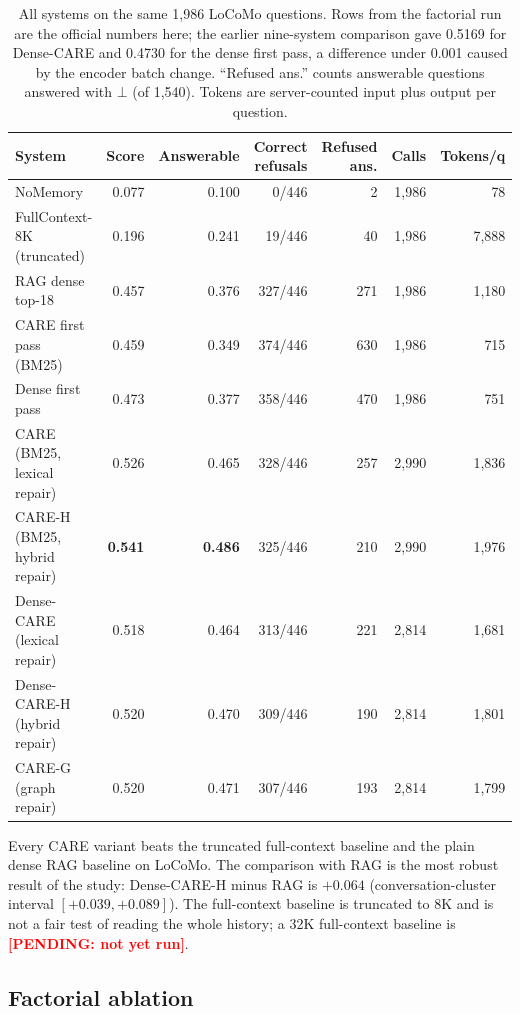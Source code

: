 \documentclass[10pt]{article}
\theoremstyle{plain}
\newcommand{\care}{\textsc{CARE}}
\newcommand{\pending}[1]{\textcolor{red}{\textbf{[PENDING: #1]}}}
\begin{document}
\begin{table}[t]
\centering
\caption{All systems on the same 1,986 LoCoMo questions. Rows from the factorial run are the official numbers here; the earlier nine-system comparison gave 0.5169 for Dense-CARE and 0.4730 for the dense first pass, a difference under 0.001 caused by the encoder batch change. ``Refused ans.'' counts answerable questions
answered with $\bot$ (of 1,540). Tokens are server-counted input plus output per question.}
\label{tab:main}
\small
\begin{tabular}{lrrrrrr}
\toprule
System & Score & Answerable & Correct refusals & Refused ans. & Calls & Tokens/q \\
\midrule
NoMemory & 0.077 & 0.100 & 0/446 & 2 & 1,986 & 78 \\
FullContext-8K (truncated) & 0.196 & 0.241 & 19/446 & 40 & 1,986 & 7,888 \\
RAG dense top-18 & 0.457 & 0.376 & 327/446 & 271 & 1,986 & 1,180 \\
\midrule
CARE first pass (BM25) & 0.459 & 0.349 & 374/446 & 630 & 1,986 & 715 \\
Dense first pass & 0.473 & 0.377 & 358/446 & 470 & 1,986 & 751 \\
\midrule
CARE (BM25, lexical repair) & 0.526 & 0.465 & 328/446 & 257 & 2,990 & 1,836 \\
CARE-H (BM25, hybrid repair) & \textbf{0.541} & \textbf{0.486} & 325/446 & 210 & 2,990 & 1,976 \\
Dense-CARE (lexical repair) & 0.518 & 0.464 & 313/446 & 221 & 2,814 & 1,681 \\
Dense-CARE-H (hybrid repair) & 0.520 & 0.470 & 309/446 & 190 & 2,814 & 1,801 \\
CARE-G (graph repair) & 0.520 & 0.471 & 307/446 & 193 & 2,814 & 1,799 \\
\bottomrule
\end{tabular}
\end{table}

Every \care{} variant beats the truncated full-context baseline and the plain dense RAG baseline on
LoCoMo. The comparison with RAG is the most robust result of the study: Dense-CARE-H minus RAG is
$+0.064$ (conversation-cluster interval $[+0.039,+0.089]$). The full-context baseline is truncated to 8K and
is not a fair test of reading the whole history; a 32K full-context baseline is \pending{not yet run}.

\subsection{Factorial ablation}
\end{document}
